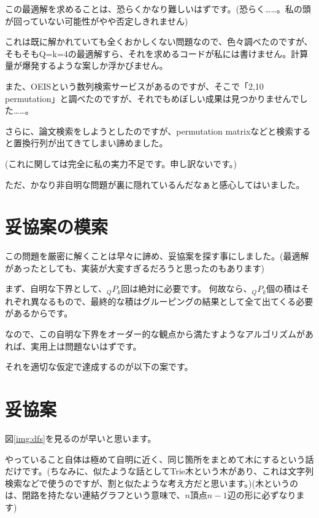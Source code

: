 \documentclass[a4paper, 10pt, dvipdfmx]{jlreq}
\begin{document}
この最適解を求めることは、恐らくかなり難しいはずです。(恐らく……。私の頭が回っていない可能性がやや否定しきれません)

これは既に解かれていても全くおかしくない問題なので、色々調べたのですが、そもそもQ=k=4の最適解すら、それを求めるコードが私には書けません。計算量が爆発するような案しか浮かびません。

また、OEISという数列検索サービスがあるのですが、そこで「2,10 permutation」と調べたのですが、それでもめぼしい成果は見つかりませんでした……。

さらに、論文検索をしようとしたのですが、permutation matrixなどと検索すると置換行列が出てきてしまい諦めました。

(これに関しては完全に私の実力不足です。申し訳ないです。)

ただ、かなり非自明な問題が裏に隠れているんだなぁと感心してはいました。

\section{妥協案の模索}

この問題を厳密に解くことは早々に諦め、妥協案を探す事にしました。(最適解があったとしても、実装が大変すぎるだろうと思ったのもあります)

まず、自明な下界として、${}_Q P_k$回は絶対に必要です。
何故なら、${}_Q P_k$個の積はそれぞれ異なるもので、最終的な積はグルーピングの結果として全て出てくる必要があるからです。

なので、この自明な下界をオーダー的な観点から満たすようなアルゴリズムがあれば、実用上は問題ないはずです。

それを適切な仮定で達成するのが以下の案です。

\section{妥協案}

図\ref{img:dfs}を見るのが早いと思います。

やっていること自体は極めて自明に近く、同じ箇所をまとめて木にするという話だけです。(ちなみに、似たような話としてTrie木という木があり、これは文字列検索などで使うのですが、割と似たような考え方だと思います。)(木というのは、閉路を持たない連結グラフという意味で、$n$頂点$n-1$辺の形に必ずなります)
\end{document}
